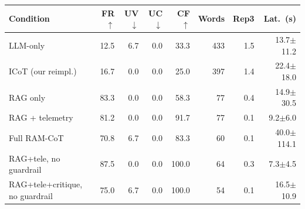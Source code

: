 \begin{tabular}{@{}lrrrrrrr@{}}
\toprule
Condition & FR$\uparrow$ & UV$\downarrow$ & UC$\downarrow$ & CF$\uparrow$ & Words & Rep3 & Lat.\ (s) \\
\midrule
LLM-only & 12.5 & 6.7 & 0.0 & 33.3 & 433 & 1.5 & 13.7$\pm$11.2 \\
ICoT (our reimpl.) & 16.7 & 0.0 & 0.0 & 25.0 & 397 & 1.4 & 22.4$\pm$18.0 \\
RAG only & 83.3 & 0.0 & 0.0 & 58.3 & 77 & 0.4 & 14.9$\pm$30.5 \\
RAG + telemetry & 81.2 & 0.0 & 0.0 & 91.7 & 77 & 0.1 & 9.2$\pm$6.0 \\
Full RAM-CoT & 70.8 & 6.7 & 0.0 & 83.3 & 60 & 0.1 & 40.0$\pm$114.1 \\
RAG+tele, no guardrail & 87.5 & 0.0 & 0.0 & 100.0 & 64 & 0.3 & 7.3$\pm$4.5 \\
RAG+tele+critique, no guardrail & 75.0 & 6.7 & 0.0 & 100.0 & 54 & 0.1 & 16.5$\pm$10.9 \\
\bottomrule
\end{tabular}